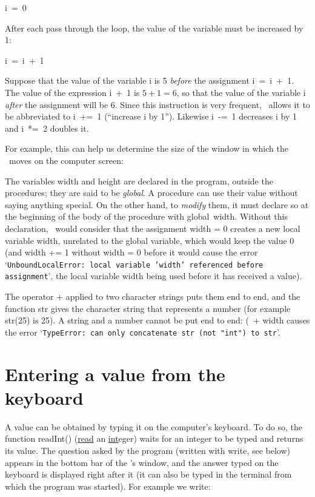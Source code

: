 \mbox{\blc  \blk\blk\idt  i\ =\ 0}\par

\noindent After each pass through the loop, the value of the variable must be increased by 1:

\mbox{\blc  \blk\blk\idt  i\ =\ i\ +\ 1}\par

\noindent Suppose that the value of the variable {\idt i} is 5 {\em before} the assignment
\mbox{\idt  i\ =\ i\ +\ 1}. The value of the expression {\idt  i\ +\ 1}
is $5 + 1 = 6$, so that the value of the variable {\idt i} {\em after} the assignment will be
6. Since this instruction is very frequent, \python\ allows it to be abbreviated to
\mbox{\idt  i\ +=\ 1} (``increase {\idt i} by 1''). Likewise \mbox{\idt  i\ -=\ 1} decreases {\idt i}
by 1 and \mbox{\idt  i\ *=\ 2} doubles it.

For example, this can help us determine the size of the window in which the \robot\
moves on the computer screen:


\noindent The variables {\idt width} and {\idt height} are declared in the program,
outside the procedures; they are said to be {\em global}\index{Global variable}. A procedure
can use their value without saying anything special. On the other hand, to {\em modify} them, it must
declare so at the beginning of the body of the procedure with {\mcl global}\index{global}\ {\idt width}.
Without this declaration, \python\ would consider that the assignment {\idt width = 0} creates a
new local variable {\idt width}, unrelated to the global variable, which would keep the
value 0 (and {\idt width += 1} without {\idt width = 0} before it would cause the error
`{\tt UnboundLocalError:\ local variable 'width' referenced before assignment}', the local
variable {\idt width} being used before it has received a value).

The operator {\idt +} applied to two character strings puts them end to end, and the
function {\idt str} gives the character string that represents a number (for
example {\idt str(25)} is {\cha {}25\char34}). A string and a number cannot
be put end to end: {\cha \char34{}(\char34}\ {\idt + width} causes the error
`{\tt TypeError:\ can only concatenate str (not "int") to str}'.

\section{Entering a value from the keyboard}
A value can be obtained by typing it on the computer's
keyboard. To
do so, the function {\idt readInt()} (\underline{read} an \underline{int}eger) waits for an integer to be typed and returns
its value. The question asked by the program (written with {\idt write}, see below)
appears in the bottom bar of the \robot's window, and the answer typed on the keyboard
is displayed right after it (it can also be typed in the terminal from which the program was started).
For example we write:


